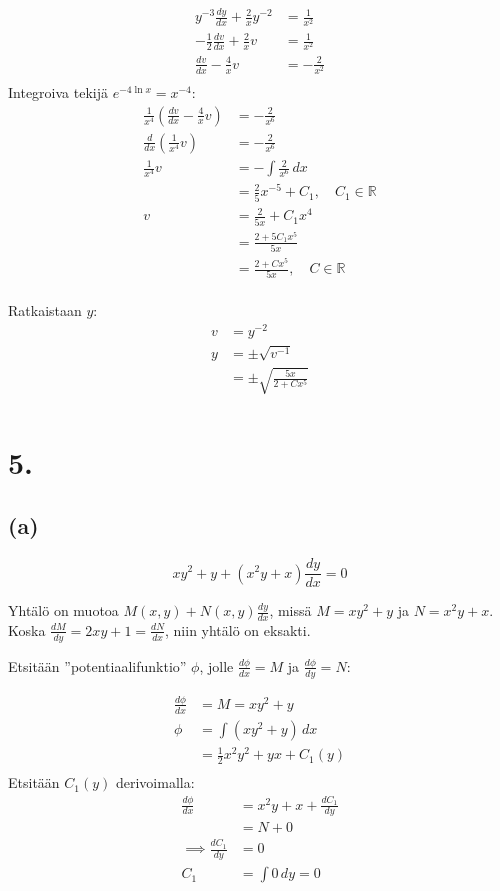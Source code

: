 \documentclass{article}
\begin{document}
\begin{align*}
  y^{-3}\frac{dy}{dx} + \frac{2}{x}y^{-2} &= \frac{1}{x^2} \\
  -\frac{1}{2}\frac{dv}{dx} + \frac{2}{x}v &= \frac{1}{x^2} \\
  \frac{dv}{dx} - \frac{4}{x}v &= -\frac{2}{x^2} \\
\end{align*}
Integroiva tekijä $e^{-4\ln x} = x^{-4}$:
\begin{align*}
  \frac{1}{x^4}(\frac{dv}{dx} - \frac{4}{x}v) &= -\frac{2}{x^6} \\
  \frac{d}{dx}(\frac{1}{x^4}v) &= -\frac{2}{x^6} \\
  \frac{1}{x^4}v &= -\int \frac{2}{x^6}\,dx \\
                 &= \frac{2}{5}x^{-5} + C_1, \quad C_1 \in \mathbb{R} \\
  v &= \frac{2}{5x} + C_1x^4 \\
    &= \frac{2 + 5C_1x^5}{5x} \\
    &= \frac{2 + Cx^5}{5x}, \quad C \in \mathbb{R} \\
\end{align*}

Ratkaistaan $y$:
\begin{align*}
  v &= y^{-2} \\
  y &= \pm \sqrt{v^{-1}} \\
    &= \pm \sqrt{\frac{5x}{2 + Cx^5}} \\
\end{align*}

\section*{5.}

\subsection*{(a)}

\[
  xy^2 + y + (x^2y + x)\frac{dy}{dx} = 0
\]

Yhtälö on muotoa $M(x, y) + N(x, y)\frac{dy}{dx}$,
missä $M = xy^2 + y$ ja $N = x^2y + x$.
Koska $\frac{dM}{dy} = 2xy + 1 = \frac{dN}{dx}$, niin yhtälö on eksakti.

Etsitään ''potentiaalifunktio'' $\phi$, jolle $\frac{d\phi}{dx} = M$ ja
$\frac{d\phi}{dy} = N$:

\begin{align*}
  \frac{d\phi}{dx} &= M = xy^2 + y \\
  \phi &= \int (xy^2 + y)\,dx \\
       &= \frac{1}{2}x^2y^2 + yx + C_1(y) \\
\end{align*}
Etsitään $C_1(y)$ derivoimalla:
\begin{align*}
  \frac{d\phi}{dx} &= x^2y + x + \frac{dC_1}{dy} \\
                   &= N + 0 \\
  \implies \frac{dC_1}{dy} &= 0 \\
  C_1 &= \int 0\,dy = 0 \\
\end{align*}
\end{document}
